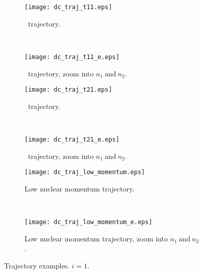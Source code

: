 \begin{figure}
\begin{subfigure}[t]{0.5\textwidth}
\centering
\texttt{[image: dc\_traj\_t11.eps]}
\caption[Double avoided crossing: \too~trajectory.]{\too~trajectory.}
\label{sf:t11}
\end{subfigure}
~
\begin{subfigure}[t]{0.5\textwidth}
\centering
\texttt{[image: dc\_traj\_t11\_e.eps]}
\caption[Double avoided crossing: \too~trajectory, zoom into $ n_{1}~\text{and}~n_{2} $.]{\too~trajectory, zoom into $ n_{1}~\text{and}~n_{2} $.}
\label{sf:t11e}
\end{subfigure}

\begin{subfigure}[t]{0.5\textwidth}
\centering
\texttt{[image: dc\_traj\_t21.eps]}
\caption[Double avoided crossing: \tto~trajectory.]{\tto~trajectory.}
\label{sf:t21}
\end{subfigure}
~
\begin{subfigure}[t]{0.5\textwidth}
\centering
\texttt{[image: dc\_traj\_t21\_e.eps]}
\caption[Double avoided crossing: \tto~trajectory, zoom into $ n_{1}~\text{and}~n_{2} $.]{\tto~trajectory, zoom into $ n_{1}~\text{and}~n_{2} $.}
\label{sf:t21e}
\end{subfigure}

\begin{subfigure}[t]{0.5\textwidth}
\centering
\texttt{[image: dc\_traj\_low\_momentum.eps]}
\caption[Double avoided crossing: low nuclear momentum trajectory.]{Low nuclear momentum trajectory.}
\label{sf:lm}
\end{subfigure}
~
\begin{subfigure}[t]{0.5\textwidth}
\centering
\texttt{[image: dc\_traj\_low\_momentum\_e.eps]}
\caption[Double avoided crossing: low nuclear momentum trajectory, zoom into $ n_{1}~\text{and}~n_{2} $.]{Low nuclear momentum trajectory, zoom into $ n_{1}~\text{and}~n_{2} $.}
\label{sf:lme}
\end{subfigure}
\caption[Double avoided crossing: trajectory examples. $ i = 1 $.]{Trajectory examples. $ i = 1 $.}
\label{f:dc1t}
\end{figure}

